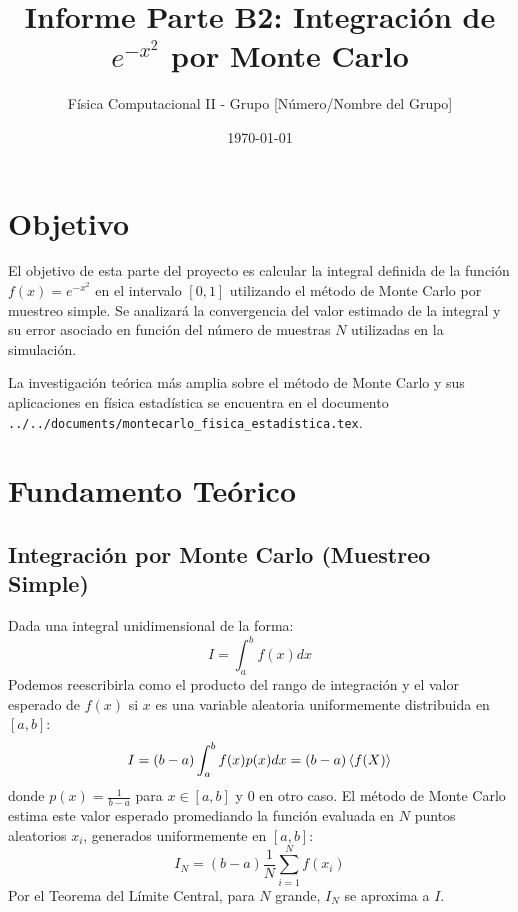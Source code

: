 \documentclass[11pt,a4paper]{article}
\title{Informe Parte B2: Integración de $e^{-x^2}$ por Monte Carlo}
\author{Física Computacional II - Grupo [Número/Nombre del Grupo]}
\date{\today}
\begin{document}
\maketitle
\tableofcontents
\newpage

\section{Objetivo}
El objetivo de esta parte del proyecto es calcular la integral definida de la función $f(x) = e^{-x^2}$ en el intervalo $[0, 1]$ utilizando el método de Monte Carlo por muestreo simple. Se analizará la convergencia del valor estimado de la integral y su error asociado en función del número de muestras $N$ utilizadas en la simulación.

La investigación teórica más amplia sobre el método de Monte Carlo y sus aplicaciones en física estadística se encuentra en el documento \texttt{../../documents/montecarlo\_fisica\_estadistica.tex}.

\section{Fundamento Teórico}
\subsection{Integración por Monte Carlo (Muestreo Simple)}
Dada una integral unidimensional de la forma:
\begin{equation}
    I = \int_a^b f(x) dx
\end{equation}
Podemos reescribirla como el producto del rango de integración y el valor esperado de $f(x)$ si $x$ es una variable aleatoria uniformemente distribuida en $[a,b]$:
\begin{equation}
    I = (b-a) \int_a^b f(x) p(x) dx = (b-a) \expval{f(X)}
\end{equation}
donde $p(x) = \frac{1}{b-a}$ para $x \in [a,b]$ y $0$ en otro caso.
El método de Monte Carlo estima este valor esperado promediando la función evaluada en $N$ puntos aleatorios $x_i$, generados uniformemente en $[a,b]$:
\begin{equation}
    I_N = (b-a) \frac{1}{N} \sum_{i=1}^N f(x_i)
\end{equation}
Por el Teorema del Límite Central, para $N$ grande, $I_N$ se aproxima a $I$.
\end{document}
